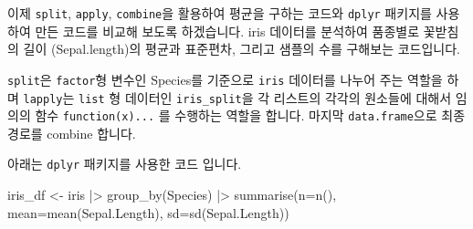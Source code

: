 \documentclass[
  a4paper,
]{book}
\newenvironment{Shaded}{\begin{snugshade}}{\end{snugshade}}
\newcommand{\AttributeTok}[1]{\textcolor[rgb]{0.40,0.45,0.13}{#1}}
\newcommand{\ControlFlowTok}[1]{\textcolor[rgb]{0.00,0.23,0.31}{#1}}
\newcommand{\FunctionTok}[1]{\textcolor[rgb]{0.28,0.35,0.67}{#1}}
\newcommand{\NormalTok}[1]{\textcolor[rgb]{0.00,0.23,0.31}{#1}}
\newcommand{\OtherTok}[1]{\textcolor[rgb]{0.00,0.23,0.31}{#1}}
\newcommand{\SpecialCharTok}[1]{\textcolor[rgb]{0.37,0.37,0.37}{#1}}
\begin{document}
이제 \texttt{split}, \texttt{apply}, \texttt{combine}을 활용하여 평균을
구하는 코드와 \texttt{dplyr} 패키지를 사용하여 만든 코드를 비교해 보도록
하겠습니다. iris 데이터를 분석하여 품종별로 꽃받침의 길이
(Sepal.length)의 평균과 표준편차, 그리고 샘플의 수를 구해보는
코드입니다.

\texttt{split}은 \texttt{factor}형 변수인 Species를 기준으로
\texttt{iris} 데이터를 나누어 주는 역할을 하며 \texttt{lapply}는
\texttt{list} 형 데이터인 \texttt{iris\_split}을 각 리스트의 각각의
원소들에 대해서 임의의 함수 \texttt{function(x)...} 를 수행하는 역할을
합니다. 마지막 \texttt{data.frame}으로 최종 경로를 combine 합니다.

\begin{Shaded}
\end{Shaded}

아래는 \texttt{dplyr} 패키지를 사용한 코드 입니다.

\begin{Shaded}
\begin{Highlighting}[]
\NormalTok{iris\_df }\OtherTok{\textless{}{-}}\NormalTok{ iris }\SpecialCharTok{|\textgreater{}} 
  \FunctionTok{group\_by}\NormalTok{(Species) }\SpecialCharTok{|\textgreater{}} 
  \FunctionTok{summarise}\NormalTok{(}\AttributeTok{n=}\FunctionTok{n}\NormalTok{(), }\AttributeTok{mean=}\FunctionTok{mean}\NormalTok{(Sepal.Length), }\AttributeTok{sd=}\FunctionTok{sd}\NormalTok{(Sepal.Length))}
\end{Highlighting}
\end{Shaded}
\end{document}
